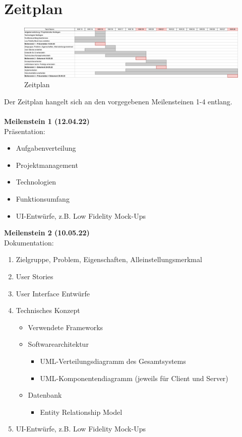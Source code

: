 \chapter*{Zeitplan}


\begin{figure}
    \centering
    \includegraphics[width=1\textwidth]{Zeitplan_DeskPlanner.png}
    \caption{Zeitplan}
    \label{fig:Zeitplan}
\end{figure}

Der Zeitplan hangelt sich an den vorgegebenen Meilensteinen 1-4 entlang.
\\
\\
\textbf{Meilenstein 1 (12.04.22)}\\
Präsentation:
\begin{itemize}
    \item Aufgabenverteilung
    \item Projektmanagement
    \item Technologien
    \item Funktionsumfang
    \item UI-Entwürfe, z.B. Low Fidelity Mock-Ups
\end{itemize}

\vspace{0.03\textwidth}
\textbf{Meilenstein 2 (10.05.22)} \\
Dokumentation:
\begin{enumerate}
    \item Zielgruppe, Problem, Eigenschaften, Alleinstellungsmerkmal
    \item User Stories
    \item User Interface Entwürfe
    \item Technisches Konzept
    \begin{itemize}
        \item Verwendete Frameworks
        \item Softwarearchitektur
        \begin{itemize}
            \item UML-Verteilungsdiagramm des Gesamtsystems
            \item UML-Komponentendiagramm (jeweils für Client und Server)
        \end{itemize}
        \item Datenbank
        \begin{itemize}
            \item Entity Relationship Model
        \end{itemize}
    \end{itemize}
    \item UI-Entwürfe, z.B. Low Fidelity Mock-Ups
\end{enumerate}

